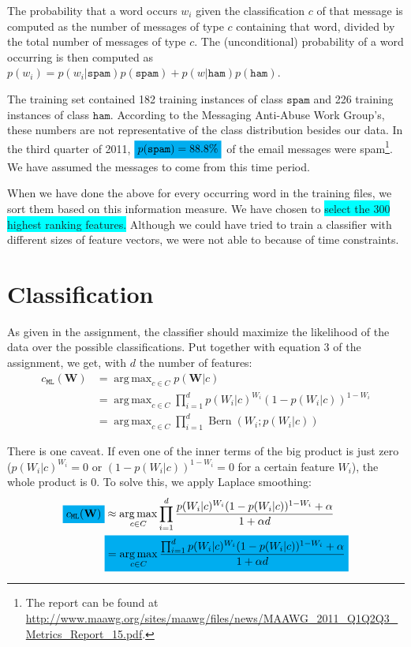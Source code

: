 \documentclass[a4paper,11pt]{article}
\DeclareMathOperator*{\argmax}{arg\,max}
\DeclareMathOperator*{\Bern}{Bern}
\newcommand{\cs}{\ensuremath{\mathtt{spam}}}
\newcommand{\ch}{\ensuremath{\mathtt{ham}}}
\newcommand{\cml}{\ensuremath{c_\mathtt{ML}}}
\newcommand{\hl}[1]{\colorbox{cyan}{#1}}
\newcommand{\mhl}[1]{\mathchoice%
  {\colorbox{cyan}{$\displaystyle#1$}}%
  {\colorbox{cyan}{$\textstyle#1$}}%
  {\colorbox{cyan}{$\scriptstyle#1$}}%
  {\colorbox{cyan}{$\scriptscriptstyle#1$}}}
\begin{document}
The probability that a word occurs $w_i$ given the classification $c$ of that message is computed as the number of messages of type $c$ containing that word, divided by the total number of messages of type $c$.  The (unconditional) probability of a word occurring is then computed as $p(w_i) = p(w_i | \cs) p(\cs) + p(w | \ch) p(\ch)$.

The training set contained 182 training instances of class $\cs$ and 226 training instances of class $\ch$.  According to the Messaging Anti-Abuse Work Group's, these numbers are not representative of the class distribution besides our data.  In the third quarter of 2011, $\mhl{p(\cs) = 88.8\%}$ of the email messages were spam\footnote{The report can be found at \url{http://www.maawg.org/sites/maawg/files/news/MAAWG_2011_Q1Q2Q3_Metrics_Report_15.pdf}.}.  We have assumed the messages to come from this time period.

When we have done the above for every occurring word in the training files, we sort them based on this information measure.  We have chosen to \hl{select the 300 highest ranking features.}  Although we could have tried to train a classifier with different sizes of feature vectors, we were not able to because of time constraints.

\section{Classification}
As given in the assignment, the classifier should maximize the likelihood of the data over the possible classifications.  Put together with equation 3 of the assignment, we get, with $d$ the number of features:
\begin{align*}
  \cml(\mathbf{W}) 
    &= \argmax_{c \in C} p(\mathbf{W} | c) \\
    &= \argmax_{c \in C} \prod_{i = 1}^{d} p(W_i | c)^{W_i} (1 - p(W_i | c))^{1 - W_i} \\
    &= \argmax_{c \in C} \prod_{i = 1}^{d} \Bern(W_i ; p(W_i | c))
\end{align*}

There is one caveat.  If even one of the inner terms of the big product is just zero ($p(W_i | c)^{W_i} = 0$ or $(1 - p(W_i | c))^{1 - W_i} = 0$ for a certain feature $W_i$), the whole product is $0$.  To solve this, we apply Laplace smoothing:
\begin{align*}
  \mhl{\cml(\mathbf{W})}
    &\approx \argmax_{c \in C} \prod_{i = 1}^{d} \frac{p(W_i | c)^{W_i} (1 - p(W_i | c))^{1 - W_i} + \alpha}{1 + \alpha d} \\
    &\mhl{= \argmax_{c \in C} \frac{\prod_{i = 1}^{d} p(W_i | c)^{W_i} (1 - p(W_i | c))^{1 - W_i} + \alpha}{1 + \alpha d}}
\end{align*}
\end{document}

